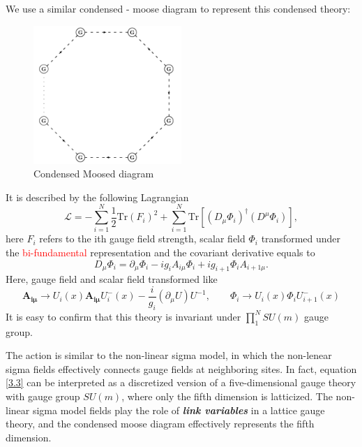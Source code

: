 \documentclass[12pt]{article}
\numberwithin{equation}{section}
\newcommand{\tif}[1]{\textit{\textbf{#1}}}
\begin{document}
We use a similar condensed - moose diagram to represent this condensed theory:
\begin{figure}[H]
    \centering
    \includegraphics[width=0.5\textwidth]{Moosed.jpeg}
    \caption{Condensed Moosed diagram}
\end{figure}
It is described by the following Lagrangian
\begin{equation}
    \mathcal{L}=-\sum_{i=1}^{N}\frac{1}{2}\mathrm{Tr}(F_i)^2+\sum_{i=1}^{N}\mathrm{Tr}[(D_\mu\Phi_i)^\dagger(D^\mu\Phi_i)],
    \label{3.3}
\end{equation}
here $F_i$ refers to the ith gauge field strength, scalar field $\Phi_i$ transformed under the \textcolor{red}{bi-fundamental} representation and the covariant derivative equals to
    \begin{equation}
        D_\mu \Phi_i=\partial_\mu \Phi_i -ig_iA_{i\mu}\Phi_i+ig_{i+1}\Phi_i A_{i+1\mu}.
    \end{equation}
    Here, gauge field and scalar field transformed like
    \begin{equation}
        \bm{A_{i\mu}}\rightarrow U_i(x) \bm{A_{i\mu}} U_i^-(x)-\frac{i}{g_i}(\partial_\mu U)U^{-1},\qquad \Phi_i\rightarrow U_i(x)\Phi_i U_{i+1}^-(x)
    \end{equation}
    It is easy to confirm that this theory is invariant under $\prod_1^N SU(m)$ gauge group.

    The action is similar to the non-linear sigma model, in which the non-lenear sigma fields effectively connects gauge fields at neighboring sites. In fact, equation \eqref{3.3} can be interpreted as a discretized version of a five-dimensional gauge theory with gauge group $SU(m)$, where only the fifth dimension is latticized. The non-linear sigma model fields play the role of \tif{link variables} in a lattice gauge theory, and the condensed moose diagram effectively represents the fifth dimension.
\end{document}
